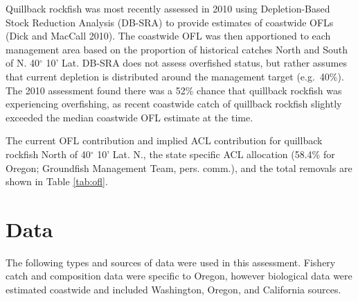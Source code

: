 \documentclass[11pt,
  english,
  a4paper,
]{article}
\begin{document}
\leavevmode\tagmcend\tagstructend\par


Quillback rockfish was most recently assessed in 2010 using Depletion-Based Stock Reduction Analysis (DB-SRA) to provide estimates of coastwide OFLs {(Dick and MacCall 2010)\leavevmode\tagmcend\tagstructend}. The coastwide OFL was then apportioned to each management area based on the proportion of historical catches North and South of N. 40{\(^\circ\)\leavevmode\tagmcend\tagstructend} 10' Lat. DB-SRA does not assess overfished status, but rather assumes that current depletion is distributed around the management target (e.g.~40\%). The 2010 assessment found there was a 52\% chance that quillback rockfish was experiencing overfishing, as recent coastwide catch of quillback rockfish slightly exceeded the median coastwide OFL estimate at the time.

\leavevmode\tagmcend\tagstructend\par


The current OFL contribution and implied ACL contribution for quillback rockfish North of 40{\(^\circ\)\leavevmode\tagmcend\tagstructend} 10' Lat. N., the state specific ACL allocation (58.4\% for Oregon; Groundfish Management Team, pers. comm.), and the total removals are shown in Table \ref{tab:ofl}.

\leavevmode\tagmcend\tagstructend\par


\hypertarget{data}{%
\section{Data}\label{data}}

\leavevmode\tagmcend\tagstructend


The following types and sources of data were used in this assessment. Fishery catch and composition data were specific to Oregon, however biological data were estimated coastwide and included Washington, Oregon, and California sources.

\leavevmode\tagmcend\tagstructend\par
\end{document}
